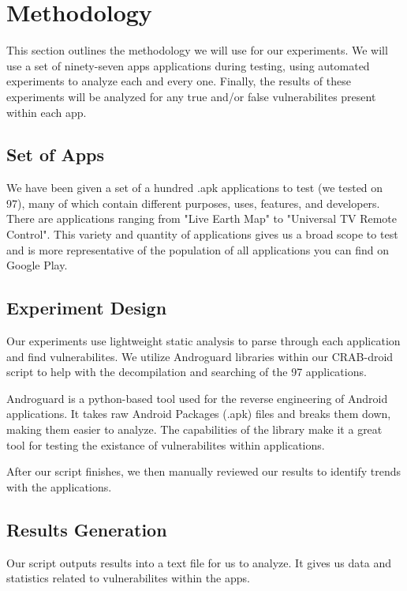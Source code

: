 \section{Methodology}
\label{sec:overview} 

This section outlines the methodology we will use for our experiments.
We will use a set of ninety-seven apps applications during testing, using
automated experiments to analyze each and every one. Finally, the results
of these experiments will be analyzed for any true and/or false vulnerabilites
present within each app.

\subsection{Set of Apps}

We have been given a set of a hundred .apk applications to test (we tested on 97), many of 
which contain different purposes, uses, features, and developers. There are 
applications ranging from "Live Earth Map" to "Universal TV Remote Control".
This variety and quantity of applications gives us a broad scope to test and is 
more representative of the population of all applications you can find on 
Google Play.

\subsection{Experiment Design}

Our experiments use lightweight static analysis to parse through each
application and find vulnerabilites. We utilize Androguard libraries within our
CRAB-droid script to help with the decompilation and searching of the 97 applications.

Androguard is a python-based tool used for the reverse engineering of
Android applications. It takes raw Android Packages (.apk) files and breaks
them down, making them easier to analyze. The capabilities of the library make it
a great tool for testing the existance of vulnerabilites within applications.

After our script finishes, we then manually reviewed our results to identify
trends with the applications.


\subsection{Results Generation}

Our script outputs results into a text file for us to analyze. It gives us 
data and statistics related to vulnerabilites within the apps. 


